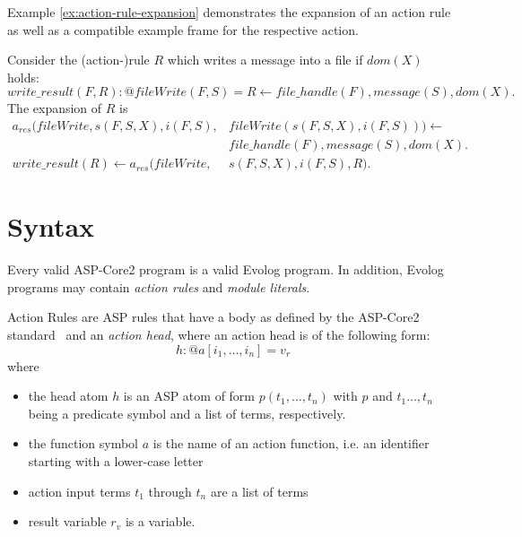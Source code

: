 Example \ref{ex:action-rule-expansion} demonstrates the expansion of an action rule as well as a compatible example frame for the respective action.

\begin{example}
\label{ex:action-rule-expansion}
Consider the (action-)rule $R$ which writes a message into a file if $dom(X)$ holds:
\[
	write\_result(F, R) : @fileWrite(F, S) = R \leftarrow file\_handle(F), message(S), dom(X).
\]
The expansion of $R$ is
\begin{align*}
	a_{res}(fileWrite, s(F, S, X), i(F, S), &fileWrite(s(F, S, X), i(F, S))) \leftarrow \\
		&file\_handle(F), message(S), dom(X). \\
	write\_result(R) \leftarrow a_{res}(fileWrite, &s(F, S, X), i(F, S), R).
\end{align*}

\end{example}




















\section{Syntax}
\label{sec:lang-syntax}

Every valid ASP-Core2 program is a valid Evolog program. In addition, Evolog programs may contain \emph{action rules} and \emph{module literals}.

\begin{definition}
\label{def:action-rule}
Action Rules are ASP rules that have a body as defined by the ASP-Core2 standard~\cite{asp-core2} and an \emph{action head}, where an action head is of the following form:
\[
h : @a[i_1,\ldots,i_n] = v_r
\]
where
	\begin{itemize}
		\item the head atom $h$ is an ASP atom of form $p(t_1,\ldots,t_n)$ with $p$ and $t_1 \ldots,t_n$ being a predicate symbol and a list of terms, respectively.
		\item the function symbol $a$ is the name of an action function, i.e. an identifier starting with a lower-case letter
		\item action input terms $t_1$ through $t_n$ are a list of terms
		\item result variable $r_v$  is a variable.
	\end{itemize}
\end{definition}

